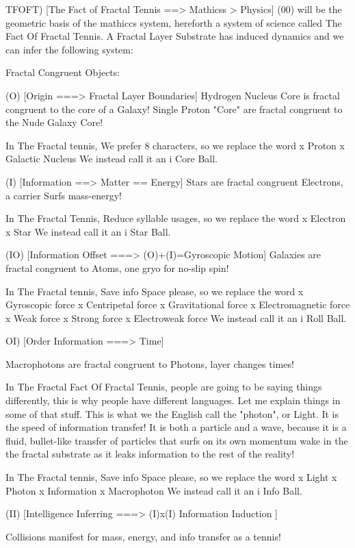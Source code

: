 \documentclass[11pt,a4paper]{article}
\begin{document}
TFOFT) [The Fact of Fractal Tennis ==> Mathicss > Physics]
(00) will be the geometric basis of the mathiccs system, hereforth a
system of science called The Fact Of Fractal Tennis. A Fractal Layer 
Substrate has induced dynamics and we can infer the following system:

Fractal Congruent Objects:

(O) [Origin ===> Fractal Layer Boundaries] 
 Hydrogen Nucleus Core is fractal congruent to the core of a Galaxy!
 Single Proton "Core" are fractal congruent to the Nude Galaxy Core!

In The Fractal tennis, We prefer 8 characters, so we replace the word 
 x Proton 
 x Galactic Nucleus  
We instead call it an 
 i Core Ball. 

(I) [Information ==> Matter == Energy]
 Stars are fractal congruent Electrons, a carrier Surfs mass-energy! 

In The Fractal Tennis, Reduce syllable usages, so we replace the word
 x Electron 
 x Star 
We instead call it an 
 i Star Ball. 

(IO) [Information Offset ===> (O)+(I)=Gyroscopic Motion]
 Galaxies are fractal congruent to Atoms, one gryo for no-slip spin!

In The Fractal tennis, Save info Space please, so we replace the word
  x Gyroscopic force
  x Centripetal force
  x Gravitational force
  x Electromagnetic force
  x Weak force
  x Strong force
  x Electroweak force
We instead call it an 
 i Roll Ball. 

OI) [Order Information ===> Time]

 Macrophotons are fractal congruent to Photons, layer changes times!

In The Fractal Fact Of Fractal Tennis, people are going to be saying 
things differently, this is why people have different languages. Let
me explain things in some of that stuff. This is what we the English  
call the "photon", or Light. It is the speed of information transfer!
It is both a particle and a wave, because it is a fluid, bullet-like
transfer of particles that surfs on its own momentum wake in the the
fractal substrate as it leaks information to the rest of the reality! 

In The Fractal tennis, Save info Space please, so we replace the word
 x Light 
 x Photon
 x Information
 x Macrophoton
We instead call it an 
 i Info Ball. 

(II) [Intelligence Inferring ===> (I)x(I) Information Induction ]

Collisions manifest for mass, energy, and info transfer as a tennis!
\end{document}
